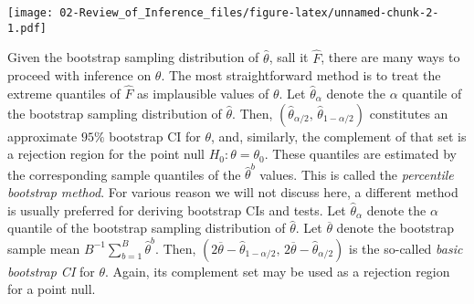 \documentclass[
]{book}
\newenvironment{Shaded}{\begin{snugshade}}{\end{snugshade}}
\newcommand{\AttributeTok}[1]{\textcolor[rgb]{0.77,0.63,0.00}{#1}}
\newcommand{\ControlFlowTok}[1]{\textcolor[rgb]{0.13,0.29,0.53}{\textbf{#1}}}
\newcommand{\DecValTok}[1]{\textcolor[rgb]{0.00,0.00,0.81}{#1}}
\newcommand{\FunctionTok}[1]{\textcolor[rgb]{0.00,0.00,0.00}{#1}}
\newcommand{\NormalTok}[1]{#1}
\newcommand{\OtherTok}[1]{\textcolor[rgb]{0.56,0.35,0.01}{#1}}
\newcommand{\SpecialCharTok}[1]{\textcolor[rgb]{0.00,0.00,0.00}{#1}}
\newcommand{\StringTok}[1]{\textcolor[rgb]{0.31,0.60,0.02}{#1}}
\theoremstyle{definition}
\theoremstyle{definition}
\theoremstyle{definition}
\theoremstyle{definition}
\theoremstyle{remark}
\begin{document}
\begin{Shaded}
\end{Shaded}

\texttt{[image: 02-Review\_of\_Inference\_files/figure-latex/unnamed-chunk-2-1.pdf]}

Given the bootstrap sampling distribution of \(\hat\theta\), sall it \(\hat F\), there are many ways to proceed with inference on \(\theta\). The most straightforward method is to treat the extreme quantiles of \(\hat F\) as implausible values of \(\theta\). Let \(\hat\theta_\alpha\) denote the \(\alpha\) quantile of the bootstrap sampling distribution of \(\hat\theta\). Then, \((\hat\theta_{\alpha/2}, \,\hat\theta_{1-\alpha/2})\) constitutes an approximate \(95\%\) bootstrap CI for \(\theta\), and, similarly, the complement of that set is a rejection region for the point null \(H_0:\theta = \theta_0\). These quantiles are estimated by the corresponding sample quantiles of the \(\hat\theta^b\) values. This is called the \emph{percentile bootstrap method}. For various reason we will not discuss here, a different method is usually preferred for deriving bootstrap CIs and tests. Let \(\hat\theta_\alpha\) denote the \(\alpha\) quantile of the bootstrap sampling distribution of \(\hat\theta\). Let \(\overline \theta\) denote the bootstrap sample mean \(B^{-1}\sum_{b=1}^B \hat\theta^b\). Then, \((2\overline \theta - \hat\theta_{1-\alpha/2}, \,2\overline \theta - \hat\theta_{\alpha/2})\) is the so-called \emph{basic bootstrap CI} for \(\theta\). Again, its complement set may be used as a rejection region for a point null.
\end{document}
